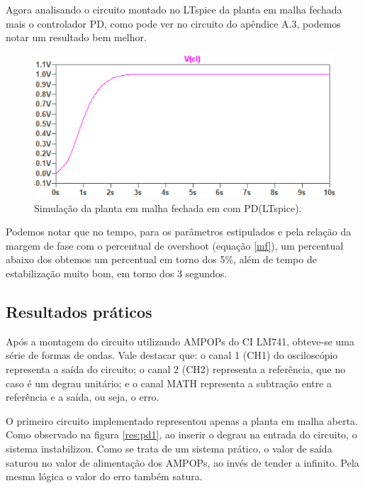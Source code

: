 Agora analisando o circuito montado no LTspice  da planta em malha fechada mais o controlador PD, como pode ver no circuito do apêndice A.3, podemos notar um resultado bem melhor.  

\begin{figure}[H]
\begin{center}
    \includegraphics[width=12cm]{images/PD_pratico/NOVO_CL_PD.png}  
\end{center}
\caption{Simulação da planta em malha fechada em com PD(LTspice).}
\label{CL} 
\end{figure}

Podemos notar que no tempo, para os parâmetros estipulados e pela relação da margem de fase com o percentual de overshoot (equação \ref{mf}), um percentual abaixo dos obtemos um percentual em torno dos 5\%, além de tempo de estabilização muito bom, em torno dos 3 segundos.

\subsection{Resultados práticos}

Após a montagem do circuito utilizando AMPOPs do CI LM741, obteve-se uma série de formas de ondas. Vale destacar que: o canal 1 (CH1) do osciloscópio representa a saída do circuito; o canal 2 (CH2) representa a referência, que no caso é um degrau unitário; e o canal MATH representa a subtração entre a referência e a saída, ou seja, o erro.

O primeiro circuito implementado representou apenas a planta em malha aberta. Como observado na figura \ref{res:pd1}, ao inserir o degrau na entrada do circuito, o sistema instabilizou. Como se trata de um sistema prático, o valor de saída saturou no valor de alimentação dos AMPOPs, ao invés de tender a infinito. Pela mesma lógica o valor do erro também satura.


